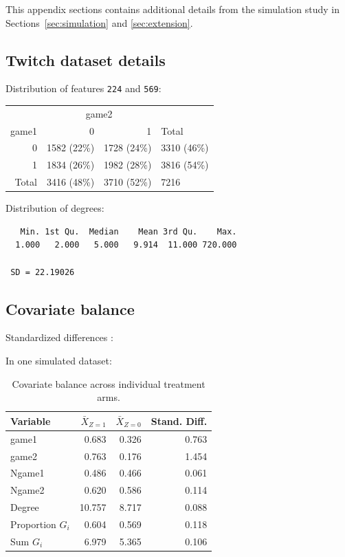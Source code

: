 \documentclass[10pt]{article}
\begin{document}
This appendix sections contains additional details from the simulation study in Sections~\ref{sec:simulation} and \ref{sec:extension}.

\subsection{Twitch dataset details} \label{apx:twitch}
\todo

Distribution of features \verb|224| and \verb|569|:

\begin{table}[H]
\centering
\begin{tabular}{@{}rrrl@{}}
\toprule
& \multicolumn{2}{c}{game2} \\
\cmidrule(lr){2-3}
game1 & 0 & 1 & Total \\
\midrule
0 & 1582 (22\%) & 1728 (24\%) & 3310 (46\%) \\
1 & 1834 (26\%) & 1982 (28\%) & 3816 (54\%) \\
Total & 3416 (48\%) & 3710 (52\%) & 7216 \\
\bottomrule
\end{tabular}
\end{table}

Distribution of degrees:
\begin{verbatim}
   Min. 1st Qu.  Median    Mean 3rd Qu.    Max. 
  1.000   2.000   5.000   9.914  11.000 720.000
  
 SD = 22.19026
\end{verbatim}

\subsection{Covariate balance} \label{apx:covbal}

Standardized differences \parencite{Austin:2011}: 

In one simulated dataset:

\begin{table}[H]
\centering
\begin{tabular}{@{}lrrr@{}}
\toprule
Variable & $\bar{X}_{Z=1}$ & $\bar{X}_{Z=0}$ & Stand. Diff. \\
\midrule
game1 & 0.683 & 0.326 & 0.763 \\
game2 & 0.763 & 0.176 & 1.454 \\
Ngame1 & 0.486 & 0.466 & 0.061 \\
Ngame2 & 0.620 & 0.586 & 0.114 \\
Degree & 10.757 & 8.717 & 0.088 \\
Proportion $G_i$ & 0.604 & 0.569 & 0.118 \\
Sum $G_i$ & 6.979 & 5.365 & 0.106 \\
\bottomrule
\end{tabular}
\caption{Covariate balance across individual treatment arms.}
\end{table}
\end{document}
